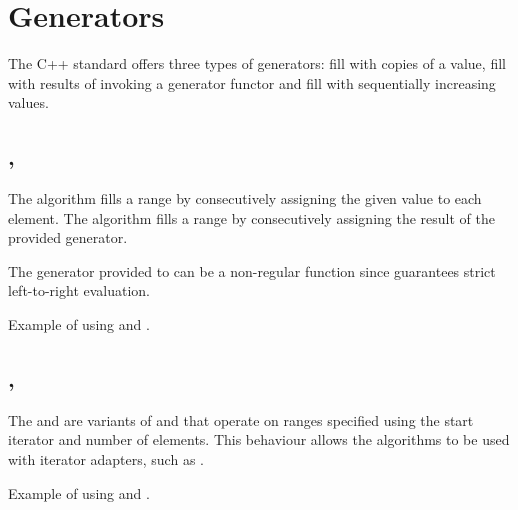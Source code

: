 \section{Generators}

The C++ standard offers three types of generators: fill with copies of a value, fill with results of invoking a generator functor and fill with sequentially increasing values.

\subsection{\texorpdfstring{, }{\texttt{std::fill}, \texttt{std::generate}}}

The  algorithm fills a range by consecutively assigning the given value to each element.
The  algorithm fills a range by consecutively assigning the result of the provided generator.



The generator provided to  can be a non-regular function since  guarantees strict left-to-right evaluation.

\begin{box-note}
\footnotesize Example of using  and .
\tcblower
{}
\end{box-note}

\subsection{\texorpdfstring{, }{\texttt{std::fill\_n}, \texttt{std::generate\_n}}}

The  and  are variants of  and  that operate on ranges specified using the start iterator and number of elements. This behaviour allows the algorithms to be used with iterator adapters, such as .


\begin{box-note}
\footnotesize Example of using  and .
\tcblower
{}
\end{box-note}

